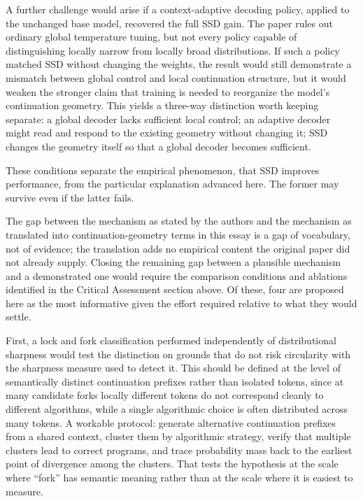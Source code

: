 \documentclass[11pt]{article}
\begin{document}
A further challenge would arise if a context-adaptive decoding policy, applied to the unchanged base model, recovered the full SSD gain. The paper rules out ordinary global temperature tuning, but not every policy capable of distinguishing locally narrow from locally broad distributions. If such a policy matched SSD without changing the weights, the result would still demonstrate a mismatch between global control and local continuation structure, but it would weaken the stronger claim that training is needed to reorganize the model's continuation geometry. This yields a three-way distinction worth keeping separate: a global decoder lacks sufficient local control; an adaptive decoder might read and respond to the existing geometry without changing it; SSD changes the geometry itself so that a global decoder becomes sufficient.

These conditions separate the empirical phenomenon, that SSD improves performance, from the particular explanation advanced here. The former may survive even if the latter fails.

The gap between the mechanism as stated by the authors and the mechanism as translated into continuation-geometry terms in this essay is a gap of vocabulary, not of evidence; the translation adds no empirical content the original paper did not already supply. Closing the remaining gap between a plausible mechanism and a demonstrated one would require the comparison conditions and ablations identified in the Critical Assessment section above. Of these, four are proposed here as the most informative given the effort required relative to what they would settle.

First, a lock and fork classification performed independently of distributional sharpness would test the distinction on grounds that do not risk circularity with the sharpness measure used to detect it. This should be defined at the level of semantically distinct continuation prefixes rather than isolated tokens, since at many candidate forks locally different tokens do not correspond cleanly to different algorithms, while a single algorithmic choice is often distributed across many tokens. A workable protocol: generate alternative continuation prefixes from a shared context, cluster them by algorithmic strategy, verify that multiple clusters lead to correct programs, and trace probability mass back to the earliest point of divergence among the clusters. That tests the hypothesis at the scale where ``fork'' has semantic meaning rather than at the scale where it is easiest to measure.
\end{document}
